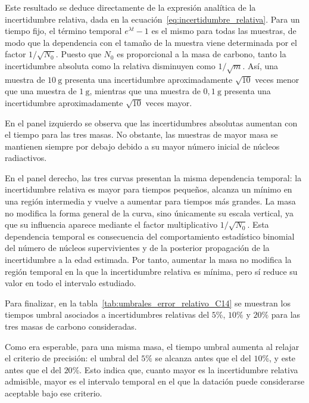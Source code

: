 \documentclass[12pt,a4paper]{article}
\begin{document}
Este resultado se deduce directamente de la expresión analítica de la incertidumbre relativa, dada en la ecuación~\ref{eq:incertidumbre_relativa}. Para un tiempo fijo, el término temporal $e^{\lambda t}-1$ es el mismo para todas las muestras, de modo que la dependencia con el tamaño de la muestra viene determinada por el factor $1/\sqrt{N_0}$. Puesto que $N_0$ es proporcional a la masa de carbono, tanto la incertidumbre absoluta como la relativa disminuyen como $1/\sqrt{m}$. Así, una muestra de $10\ \text{g}$ presenta una incertidumbre aproximadamente $\sqrt{10}$ veces menor que una muestra de $1\ \text{g}$, mientras que una muestra de $0{,}1\ \text{g}$ presenta una incertidumbre aproximadamente $\sqrt{10}$ veces mayor.

En el panel izquierdo se observa que las incertidumbres absolutas aumentan con el tiempo para las tres masas. No obstante, las muestras de mayor masa se mantienen siempre por debajo debido a su mayor número inicial de núcleos radiactivos.

En el panel derecho, las tres curvas presentan la misma dependencia temporal: la incertidumbre relativa es mayor para tiempos pequeños, alcanza un mínimo en una región intermedia y vuelve a aumentar para tiempos más grandes. La masa no modifica la forma general de la curva, sino únicamente su escala vertical, ya que su influencia aparece mediante el factor multiplicativo $1/\sqrt{N_0}$. Esta dependencia temporal es consecuencia del comportamiento estadístico binomial del número de núcleos supervivientes y de la posterior propagación de la incertidumbre a la edad estimada. Por tanto, aumentar la masa no modifica la región temporal en la que la incertidumbre relativa es mínima, pero sí reduce su valor en todo el intervalo estudiado.

Para finalizar, en la tabla~\ref{tab:umbrales_error_relativo_C14} se muestran los tiempos umbral asociados a incertidumbres relativas del $5\%$, $10\%$ y $20\%$ para las tres masas de carbono consideradas.

\begin{table}[H]
\centering
\small

\caption{Edad aproximada a partir de la cual la incertidumbre relativa analítica alcanza los umbrales del $5\%$, $10\%$ y $20\%$ para distintas masas de carbono.}
\label{tab:umbrales_error_relativo_C14}
\end{table}

Como era esperable, para una misma masa, el tiempo umbral aumenta al relajar el criterio de precisión: el umbral del $5\%$ se alcanza antes que el del $10\%$, y este antes que el del $20\%$. Esto indica que, cuanto mayor es la incertidumbre relativa admisible, mayor es el intervalo temporal en el que la datación puede considerarse aceptable bajo ese criterio.
\end{document}
